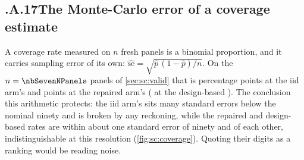 \subsection*{\thechapter.A.17\quad The Monte-Carlo error of a coverage estimate}
\label{app:sc:mcerr}
A coverage rate measured on $n$ fresh panels is a binomial proportion, and it carries sampling
error of its own: $\widehat{\text{se}} = \sqrt{\hat p\,(1-\hat p)/n}$. On the
$n = \nbSevenNPanels$ panels of \cref{sec:sc:valid} that is \nbSevenCovSeIid{} percentage points at
the iid arm's \pc{\nbSevenTotalCov} and \nbSevenCovSeArone{} points at the repaired arm's
\pc{\nbSevenTotalCovArone} (\nbSevenCovSeRi{} at the design-based \pc{\nbSevenRiCov}). The
conclusion this arithmetic protects: the iid arm's \pc{\nbSevenTotalCov} sits many standard errors
below the nominal ninety and is broken by any reckoning, while the repaired and design-based rates
are within about one standard error of ninety and of each other, indistinguishable at this
resolution (\cref{fig:sc:coverage}). Quoting their digits as a ranking would be reading noise.

